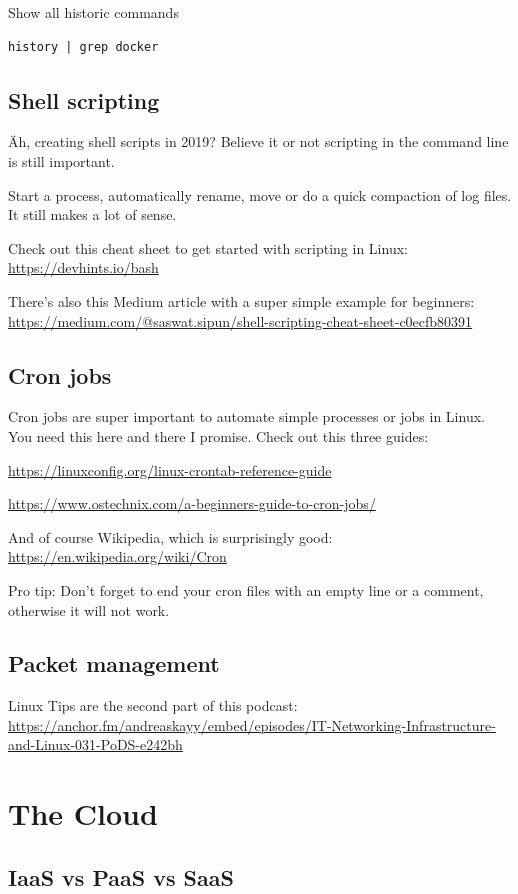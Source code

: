\documentclass[12pt, numbers=noenddot]{scrreprt} %
\begin{document}
Show all historic commands
\begin{lstlisting}
history | grep docker
\end{lstlisting}

\section{Shell scripting}

Äh, creating shell scripts in 2019? Believe it or not scripting in the command line is still important. 

Start a process, automatically rename, move or do a quick compaction of log files. It still makes a lot of sense. 

Check out this cheat sheet to get started with scripting in Linux: \url{https://devhints.io/bash} 

There's also this Medium article with a super simple example for beginners: \url{https://medium.com/@saswat.sipun/shell-scripting-cheat-sheet-c0ecfb80391} 

\section{Cron jobs}

Cron jobs are super important to automate simple processes or jobs in Linux. You need this here and there I promise.
Check out this three guides:

\url{https://linuxconfig.org/linux-crontab-reference-guide}

\url{https://www.ostechnix.com/a-beginners-guide-to-cron-jobs/}

And of course Wikipedia, which is surprisingly good: \url{https://en.wikipedia.org/wiki/Cron}

Pro tip: Don't forget to end your cron files with an empty line or a comment, otherwise it will not work.

\section{Packet management}
Linux Tips are the second part of this podcast: \url{https://anchor.fm/andreaskayy/embed/episodes/IT-Networking-Infrastructure-and-Linux-031-PoDS-e242bh}

\chapter{The Cloud}
\section{IaaS vs PaaS vs SaaS}
\end{document}
